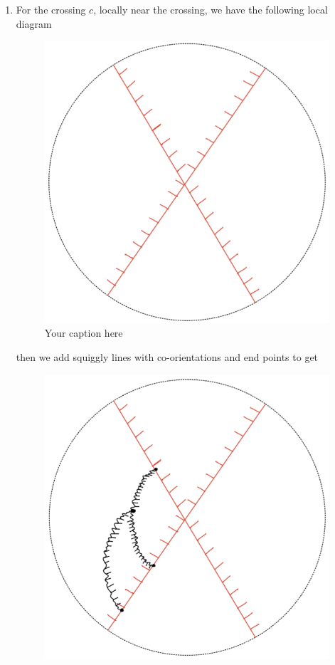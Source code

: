 \begin{definition}
\begin{enumerate}[label = (\roman*)]
\item For the crossing $c$, locally near the crossing, we have the following local diagram
\begin{figure}[H] 
    \centering
    \includegraphics[scale = 0.95]{diagrams/local_systems_on_as_diagrams/9.png} 
    \caption{Your caption here}
    \label{fig:your-label}
\end{figure}
then we add squiggly lines with co-orientations and end points to get
\begin{figure}[H] 
    \centering
    \includegraphics[scale = 0.95]{diagrams/local_systems_on_as_diagrams/10.png} 

\end{figure}
\end{enumerate}
\end{definition}
